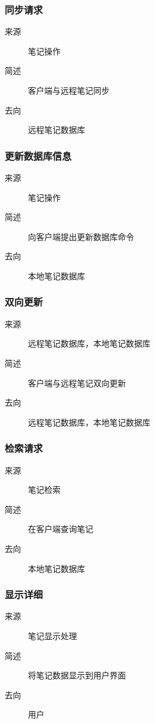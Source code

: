 \subsubsection{同步请求}
\begin{description}
  \item[来源]笔记操作
\item[简述]客户端与远程笔记同步
\item[去向]远程笔记数据库
\end{description}

\subsubsection{更新数据库信息}
\begin{description}
  \item[来源]笔记操作
\item[简述]向客户端提出更新数据库命令
\item[去向]本地笔记数据库
\end{description}


\subsubsection{双向更新}
\begin{description}
  \item[来源]远程笔记数据库，本地笔记数据库
\item[简述]客户端与远程笔记双向更新
\item[去向]远程笔记数据库，本地笔记数据库
\end{description}

\subsubsection{检索请求}
\begin{description}
  \item[来源]笔记检索
\item[简述]在客户端查询笔记
\item[去向]本地笔记数据库
\end{description}

\subsubsection{显示详细}
\begin{description}
  \item[来源]笔记显示处理
\item[简述]将笔记数据显示到用户界面
\item[去向]用户
\end{description}

